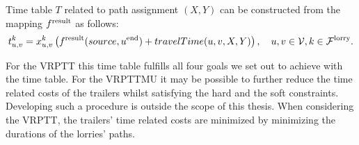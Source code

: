

%

Time table $T$ related to path assignment $(X,Y)$  can be constructed from the mapping $f^{\rm result}$ as follows:
\begin{align}
	t^k_{u,v} =
  x^k_{u,v} \left(
   f^{\rm result}(source,u^{\rm end}) + travelTime(u,v,X,Y)
	\right),
	\quad u,v \in \mathcal V, k \in \mathcal F^{\rm lorry}. \notag
\end{align}

For the VRPTT this time table fulfills all four goals we set out to achieve with the time table. For the VRPTTMU it may be possible to further reduce the time related costs of the trailers whilst satisfying the hard and the soft constraints. Developing such a procedure is outside the scope of this thesis. When considering the VRPTT, the trailers' time related costs are minimized by minimizing the durations of the lorries' paths. \\

